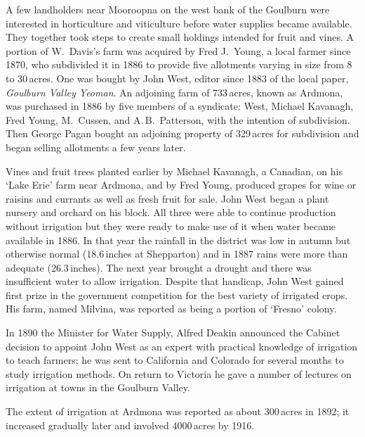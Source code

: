 A few landholders near Mooroopna  on the west
bank of the Goulburn were interested in horticulture and viticulture
before water supplies became available.  They together took steps to
create small holdings intended for fruit and
vines.  A portion of W.~Davis's farm was acquired by
Fred J.~Young,  a local farmer since 1870, who
subdivided it in 1886 to provide five allotments varying in size from
8 to 30\,acres. One was bought by John West, editor since 1883 of the
local paper, \textit{Goulburn Valley Yeoman}.  An adjoining farm of
733\,acres, known as Ardmona, was purchased in 1886 by five members of
a syndicate: West, Michael Kavanagh, Fred Young, M.~Cussen, and
A.\,B.~Patterson, with the intention of subdivision.  Then George
Pagan bought an adjoining property of 329\,acres for subdivision and
began selling allotments a few years later.

Vines and fruit trees planted earlier by Michael Kavanagh,
 a Canadian, on his `Lake Erie'
farm near Ardmona, and by Fred Young, produced grapes
 for wine or raisins and currants as well as
fresh fruit for sale.  John West  began a
plant nursery and orchard on his block.  All three were able to
continue production without irrigation but they were ready to make use
of it when water became available in 1886.  In that year the rainfall
in the district was low in autumn but otherwise normal (18.6\,inches
at Shepparton) and in 1887 rains were more than adequate
(26.3\,inches).  The next year brought a drought and
there was insufficient water to allow irrigation.  Despite that
handicap, John West gained first prize in the government competition
for the best variety of irrigated crops. His farm, named Milvina, was
reported as being a portion of `Fresno'
colony.

In 1890 the Minister for Water Supply, Alfred Deakin  announced the Cabinet decision to appoint John West as an expert
with practical knowledge of irrigation to teach farmers; he was sent
to California and Colorado for several months to
study irrigation methods. On return to Victoria he gave a number of
lectures on irrigation at towns in the Goulburn
Valley.

The extent of irrigation at Ardmona was reported as about 300\,acres
in 1892; it increased gradually later and involved 4000\,acres by
1916.

